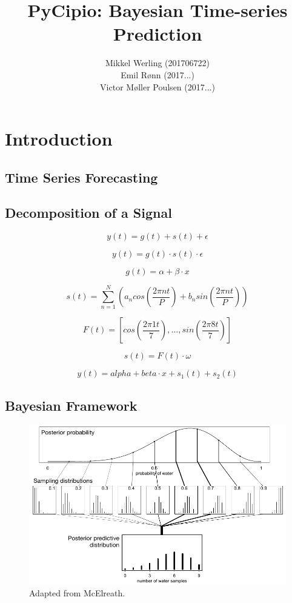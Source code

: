 \documentclass{article}
\title{PyCipio: Bayesian Time-series Prediction}
\author{Mikkel Werling (201706722) \\
    Emil Rønn (2017...) \\
    Victor Møller Poulsen (2017...)}
\date{}
\begin{document}
\maketitle
\section{Introduction}
\subsection{Time Series Forecasting}
\subsection{Decomposition of a Signal}

$$y(t) = g(t) + s(t) + \epsilon$$

$$y(t) = g(t) \cdot s(t) \cdot \epsilon $$

$$g(t) = \alpha + \beta \cdot x$$

$$s(t) = \sum _{n=1} ^N \left( a_n cos(\frac{2 \pi n t}{P}) + b_n sin(\frac{2 \pi n t}{P}) \right)$$

$$F(t) = \left[ cos(\frac{2 \pi 1 t}{7}), \dots, sin(\frac{2 \pi 8 t}{7}) \right]$$

$$s(t) = F(t) \cdot \omega$$

$$y(t) = alpha + beta \cdot x + s_1(t) + s_2(t)$$

\subsection{Bayesian Framework}

\begin{figure}[H]
    \centerline{\includegraphics[scale = 0.5]{images/McElreath.png}}
    \caption{Adapted from McElreath.}
\end{figure}
\end{document}
